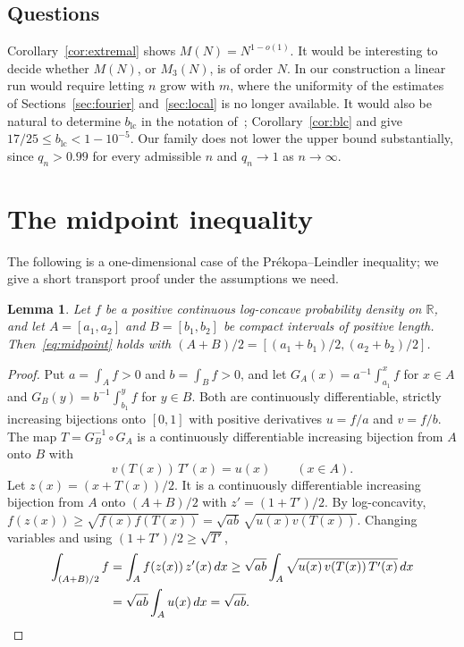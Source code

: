 \documentclass{amsart}
\newtheorem{lemma}[theorem]{Lemma}
\theoremstyle{definition}
\theoremstyle{remark}
\numberwithin{equation}{section}
\newcommand{\R}{\mathbb{R}}
\begin{document}
\subsection{Questions}

Corollary~\ref{cor:extremal} shows $M(N)=N^{1-o(1)}$. It would be interesting to decide whether $M(N)$, or $M_3(N)$, is of order $N$. In our construction a linear run would require letting $n$ grow with $m$, where the uniformity of the estimates of Sections~\ref{sec:fourier} and~\ref{sec:local} is no longer available. It would also be natural to determine $b_{\mathrm{lc}}$ in the notation of~\cite{FLNYZ26}; Corollary~\ref{cor:blc} and \cite[Theorem~1.2]{FLNYZ26} give $17/25\le b_{\mathrm{lc}}<1-10^{-5}$. Our family does not lower the upper bound substantially, since $q_n>0.99$ for every admissible $n$ and $q_n\to1$ as $n\to\infty$.

\appendix

\section{The midpoint inequality}\label{app:midpoint}

The following is a one-dimensional case of the Pr\'ekopa--Leindler inequality; we give a short transport proof under the assumptions we need.

\begin{lemma}\label{lem:midpoint}
Let $f$ be a positive continuous log-concave probability density on $\R$, and let $A=[a_1,a_2]$ and $B=[b_1,b_2]$ be compact intervals of positive length. Then~\eqref{eq:midpoint} holds with $(A+B)/2=[(a_1+b_1)/2,(a_2+b_2)/2]$.
\end{lemma}

\begin{proof}
Put $a=\int_Af>0$ and $b=\int_Bf>0$, and let $G_A(x)=a^{-1}\int_{a_1}^xf$ for $x\in A$ and $G_B(y)=b^{-1}\int_{b_1}^yf$ for $y\in B$. Both are continuously differentiable, strictly increasing bijections onto $[0,1]$ with positive derivatives $u=f/a$ and $v=f/b$. The map $T=G_B^{-1}\circ G_A$ is a continuously differentiable increasing bijection from $A$ onto $B$ with
\[
v(T(x))\,T'(x)=u(x)\qquad(x\in A).
\]
Let $z(x)=(x+T(x))/2$. It is a continuously differentiable increasing bijection from $A$ onto $(A+B)/2$ with $z'=(1+T')/2$. By log-concavity, $f(z(x))\ge\sqrt{f(x)f(T(x))}=\sqrt{ab}\,\sqrt{u(x)v(T(x))}$. Changing variables and using $(1+T')/2\ge\sqrt{T'}$,
\[
\begin{split}
\int_{(A+B)/2}f&=\int_Af(z(x))\,z'(x)\,dx\ge\sqrt{ab}\int_A\sqrt{u(x)\,v(T(x))\,T'(x)}\,dx\\
&=\sqrt{ab}\int_Au(x)\,dx=\sqrt{ab}.
\end{split}
\qedhere
\]
\end{proof}
\end{document}
